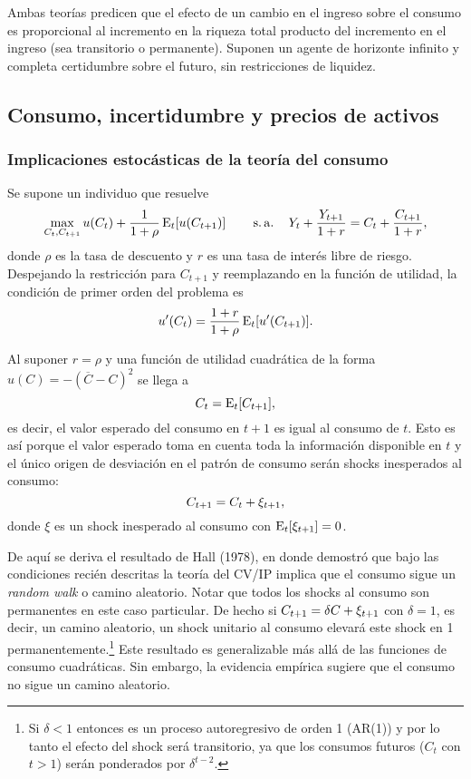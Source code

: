 \documentclass[DeGregorioResumen]{subfiles}
\begin{document}
Ambas teorías predicen que el efecto de un cambio en el ingreso sobre el consumo es proporcional al incremento en la riqueza total producto del incremento en el ingreso (sea transitorio o permanente). Suponen un agente de horizonte infinito y completa certidumbre sobre el futuro, sin restricciones de liquidez.

\subsection{Consumo, incertidumbre y precios de activos}

\subsubsection{Implicaciones estocásticas de la teoría del consumo}

Se supone un individuo que resuelve
\begin{equation*}
\max_{C_t,C_{t+1}} u(C_t)+\frac{1}{1+\rho}\operatorname{E}_{t}[u(C_{t+1})] \operatorname{\qquad s.a.\quad} Y_t+\frac{Y_{t+1}}{1+r}=C_t+\frac{C_{t+1}}{1+r},
\end{equation*}
donde $\rho $ es la tasa de descuento y $r$ es una tasa de interés libre de riesgo. Despejando la restricción para $C_{t+1}$ y reemplazando en la función de utilidad, la condición de primer orden del problema es
\begin{equation*}
u'(C_t)= \frac{1+r}{1+\rho} \operatorname{E}_{t}[u'(C_{t+1})].
\end{equation*}

Al suponer $r=\rho$ y una función de utilidad cuadrática de la forma $u(C)=-(\overline{C}-C)^2$ se llega a
\begin{equation*}
C_t=\operatorname{E}_t[C_{t+1}],
\end{equation*}
es decir, el valor esperado del consumo en $t+1 $ es igual al consumo de $t $. Esto es así porque el valor esperado toma en cuenta toda la información disponible en $t$ y el único origen de desviación en el patrón de consumo serán shocks inesperados al consumo:
\begin{equation}
{C}_{t+1}={C}_{t}+{\xi}_{t+1},
\end{equation}
donde $\xi$ es un shock inesperado al consumo con $\operatorname{E}_{t}[{\xi}_{t+1}]=0$.

De aquí se deriva el resultado de Hall (1978), en donde demostró que bajo las condiciones recién descritas la teoría del CV/IP implica que el consumo sigue un \textit{random walk} o camino aleatorio. Notar que todos los shocks al consumo son permanentes en este caso particular. De hecho si ${C}_{t+1}=\delta C+\xi_{t+1}$ con  $\delta=1$, es decir, un camino aleatorio, un shock unitario al consumo elevará este shock en 1 permanentemente.\footnote{Si $\delta<1$ entonces es un proceso autoregresivo de orden 1 (AR(1)) y por lo tanto el efecto del shock será transitorio, ya que los consumos futuros ($C_t$ con $t>1$) serán ponderados por $\delta^{t-2}$.} Este resultado es generalizable más allá de las funciones de consumo cuadráticas. Sin embargo, la evidencia empírica sugiere que el consumo no sigue un camino aleatorio.
\end{document}
